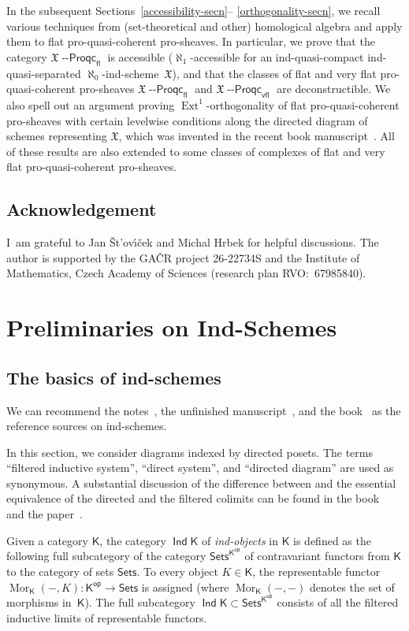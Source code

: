\documentclass[12pt,a4paper]{amsart}
\newcommand{\+}{\protect\nobreakdash-}
\renewcommand{\:}{\colon}
\newcommand{\rarrow}{\longrightarrow}
\DeclareMathOperator{\Mor}{Mor}
\DeclareMathOperator{\Ext}{Ext}
\DeclareMathOperator{\Ind}{\mathsf{Ind}}
\newcommand{\Proqc}{{\operatorname{\mathsf{--Proqc}}}}
\newcommand{\fl}{\mathsf{fl}}
\newcommand{\vfl}{\mathsf{vfl}}
\newcommand{\Sets}{\mathsf{Sets}}
\newcommand{\sop}{\mathsf{op}}
\newcommand{\sK}{\mathsf K}
\newcommand{\fX}{\mathfrak X}
\newcommand{\Section}[1]{\bigskip\section{#1}\medskip}
\theoremstyle{plain}
\theoremstyle{definition}
\begin{document}
 In the subsequent Sections~\ref{accessibility-secn}\+-%
\ref{orthogonality-secn}, we recall various techniques from
(set-theoretical and other) homological algebra and apply them
to flat pro-quasi-coherent pro-sheaves.
 In particular, we prove that the category $\fX\Proqc_\fl$ is
accessible ($\aleph_1$\+accessible for an ind-quasi-compact
ind-quasi-separated $\aleph_0$\+ind-scheme~$\fX$), and that the classes
of flat and very flat pro-quasi-coherent pro-sheaves $\fX\Proqc_\fl$
and $\fX\Proqc_\vfl$ are deconstructible.
 We also spell out an argument proving $\Ext^1$\+orthogonality
of flat pro-quasi-coherent pro-sheaves with certain levelwise
conditions along the directed diagram of schemes representing $\fX$,
which was invented in the recent book
manuscript~\cite[Section~8.5]{Pform}.
 All of these results are also extended to some classes of
complexes of flat and very flat pro-quasi-coherent pro-sheaves.

\subsection*{Acknowledgement}
 I~am grateful to Jan \v St\!'ov\'\i\v cek and Michal Hrbek
for helpful discussions.
 The author is supported by the GA\v CR project 26-22734S
and the Institute of Mathematics, Czech Academy of Sciences
(research plan RVO:~67985840).



\Section{Preliminaries on Ind-Schemes}
\label{preliminaries-on-ind-schemes-secn}

\subsection{The basics of ind-schemes}
\label{basics-of-ind-schemes-subsecn}
 We can recommend the notes~\cite{Rich}, the unfinished
manuscript~\cite[Section~7.11]{BD2}, and the book~\cite{Psemten}
as the reference sources on ind-schemes.

 In this section, we consider diagrams indexed by directed posets.
 The terms ``filtered inductive system'', ``direct system'', and
``directed diagram'' are used as synonymous.
 A substantial discussion of the difference between and the essential
equivalence of the directed and the filtered colimits can be found in
the book~\cite[Theorem~1.5]{AR} and the paper~\cite{AN}.

 Given a category $\sK$, the category $\Ind \sK$ of \emph{ind-objects}
in $\sK$ is defined as the following full subcategory of the category
$\Sets^{\sK^\sop}$ of contravariant functors from $\sK$ to the category
of sets $\Sets$.
 To every object $K\in\sK$, the representable functor
$\Mor_\sK({-},K)\:\sK^\sop\rarrow\Sets$ is assigned (where
$\Mor_\sK({-},{-})$ denotes the set of morphisms in~$\sK$).
 The full subcategory $\Ind\sK\subset\Sets^{\sK^\sop}$ consists of
all the filtered inductive limits of representable functors.
\end{document}
